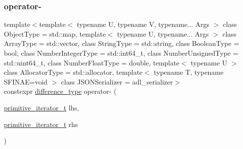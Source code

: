 \subsubsection{\texorpdfstring{operator-\/}{operator-}}
{\footnotesize\ttfamily template$<$template$<$ typename U, typename V, typename... Args $>$ class Object\+Type = std\+::map, template$<$ typename U, typename... Args $>$ class Array\+Type = std\+::vector, class String\+Type  = std\+::string, class Boolean\+Type  = bool, class Number\+Integer\+Type  = std\+::int64\+\_\+t, class Number\+Unsigned\+Type  = std\+::uint64\+\_\+t, class Number\+Float\+Type  = double, template$<$ typename U $>$ class Allocator\+Type = std\+::allocator, template$<$ typename T, typename S\+F\+I\+N\+A\+E=void $>$ class J\+S\+O\+N\+Serializer = adl\+\_\+serializer$>$ \\
constexpr \hyperlink{classnlohmann_1_1basic__json_afe7c1303357e19cea9527af4e9a31d8f}{difference\+\_\+type} operator-\/ (\begin{DoxyParamCaption}\item[{\hyperlink{classnlohmann_1_1basic__json_1_1primitive__iterator__t}{primitive\+\_\+iterator\+\_\+t}}]{lhs,  }\item[{\hyperlink{classnlohmann_1_1basic__json_1_1primitive__iterator__t}{primitive\+\_\+iterator\+\_\+t}}]{rhs }\end{DoxyParamCaption})\hspace{0.3cm}{\ttfamily [friend]}}

\mbox{\label{classnlohmann_1_1basic__json_1_1primitive__iterator__t_a901a95e6d73c9509d3dcde914f6c8a9d}} 
